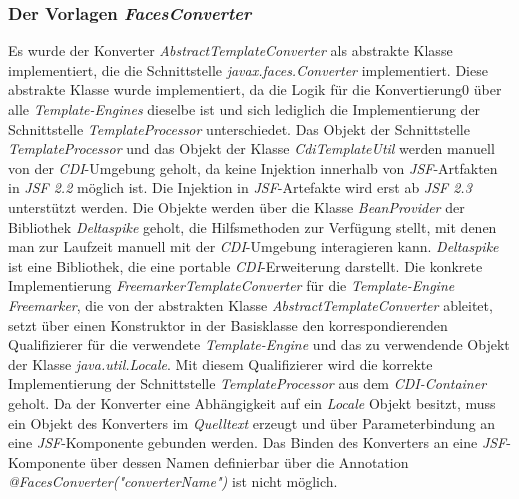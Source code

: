 \subsubsection{Der Vorlagen \emph{FacesConverter}}
Es wurde der Konverter \emph{AbstractTemplateConverter} als abstrakte Klasse implementiert, die die Schnittstelle \emph{javax.faces.Converter} implementiert. Diese abstrakte Klasse wurde implementiert, da die Logik für die Konvertierung0 über alle \emph{Template-Engines} dieselbe ist und sich lediglich die Implementierung der Schnittstelle \emph{TemplateProcessor} unterschiedet. Das Objekt der Schnittstelle \emph{TemplateProcessor} und das Objekt der Klasse \emph{CdiTemplateUtil} werden manuell von der \emph{CDI}-Umgebung geholt, da keine Injektion innerhalb von \emph{JSF}-Artfakten in \emph{JSF 2.2} möglich ist. Die Injektion in \emph{JSF}-Artefakte wird erst ab \emph{JSF 2.3} unterstützt werden. Die Objekte werden über die Klasse \emph{BeanProvider} der Bibliothek \emph{Deltaspike} geholt, die Hilfsmethoden zur Verfügung stellt, mit denen man zur Laufzeit manuell mit der \emph{CDI}-Umgebung interagieren kann. \emph{Deltaspike} ist eine Bibliothek, die eine portable \emph{CDI}-Erweiterung darstellt. 
\newline
\newline
Die konkrete Implementierung \emph{FreemarkerTemplateConverter} für die \emph{Template-Engine Freemarker}, die von der abstrakten Klasse \emph{AbstractTemplateConverter} ableitet, setzt über einen Konstruktor in der Basisklasse den korrespondierenden Qualifizierer für die verwendete \emph{Template-Engine} und das zu verwendende Objekt der Klasse \emph{java.util.Locale}. Mit diesem Qualifizierer wird die korrekte Implementierung der Schnittstelle \emph{TemplateProcessor} aus dem \emph{CDI-Container} geholt. Da der Konverter eine Abhängigkeit auf ein \emph{Locale} Objekt besitzt, muss ein Objekt des Konverters im \emph{Quelltext} erzeugt und über Parameterbindung an eine \emph{JSF}-Komponente gebunden werden. Das Binden des Konverters an eine \emph{JSF}-Komponente über dessen Namen definierbar über die Annotation \emph{@FacesConverter("converterName")} ist nicht möglich. 

